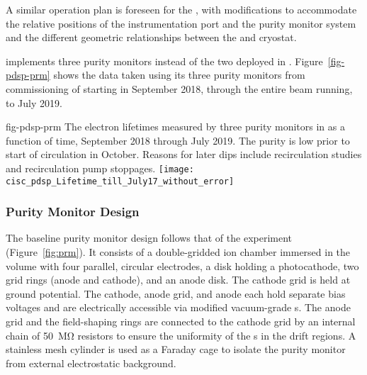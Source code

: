   A similar 
  operation plan is foreseen for %
  the , with modifications to accommodate the relative positions of the instrumentation port %
  and the purity monitor system and the %
  different geometric relationships between the  and cryostat.





 implements three purity monitors instead of the two deployed in .
Figure~\ref{fig-pdsp-prm} shows the  data taken using %
its three purity monitors from commissioning of  starting in September 2018, through the entire beam running, to July 2019.

\begin{dunefigure}{fig-pdsp-prm}
  {The electron lifetimes measured by three purity monitors in  as a function of time, September 2018 through July 2019. The purity is low prior to start of circulation in October. Reasons for later dips include recirculation studies and recirculation pump stoppages.}
  \texttt{[image: cisc\_pdsp\_Lifetime\_till\_July17\_without\_error]}
\end{dunefigure}

\subsubsection{Purity Monitor Design}

The  baseline purity monitor design follows that of  the  experiment (Figure~\ref{fig:prm})\cite{Adamowski:2014daa}.  It consists of a double-gridded ion chamber immersed in the \lar volume with four parallel, circular electrodes, a disk holding a photocathode, two grid rings (anode and cathode), and an anode disk. The cathode grid is held at ground potential. The cathode, anode grid, and anode 
each hold separate bias voltages and are electrically accessible via modified vacuum-grade  \fdth{}s. %
The anode grid and the field-shaping rings are connected to the cathode grid by an internal chain of \SI{50}{\mega\ohm} resistors to ensure the uniformity of the \efield{}s in the drift regions. A stainless mesh cylinder is used as a Faraday cage to isolate the purity monitor from external electrostatic background. 

